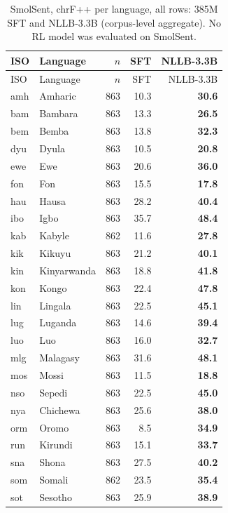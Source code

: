 {\footnotesize\setlength{\tabcolsep}{3pt}
\begin{longtable}{@{}llrrr@{}}
\caption{SmolSent, chrF++ per language, all rows: 385M SFT and NLLB-3.3B (corpus-level aggregate). No RL model was evaluated on SmolSent.}\label{tab:full-smol-chrfpp}\\
\toprule
ISO & Language & $n$ & SFT & NLLB-3.3B \\
\midrule\endfirsthead
\toprule
ISO & Language & $n$ & SFT & NLLB-3.3B \\
\midrule\endhead
\midrule\endfoot
\bottomrule\endlastfoot
amh & Amharic & 863 & 10.3 & \textbf{30.6} \\
bam & Bambara & 863 & 13.3 & \textbf{26.5} \\
bem & Bemba & 863 & 13.8 & \textbf{32.3} \\
dyu & Dyula & 863 & 10.5 & \textbf{20.8} \\
ewe & Ewe & 863 & 20.6 & \textbf{36.0} \\
fon & Fon & 863 & 15.5 & \textbf{17.8} \\
hau & Hausa & 863 & 28.2 & \textbf{40.4} \\
ibo & Igbo & 863 & 35.7 & \textbf{48.4} \\
kab & Kabyle & 862 & 11.6 & \textbf{27.8} \\
kik & Kikuyu & 863 & 21.2 & \textbf{40.1} \\
kin & Kinyarwanda & 863 & 18.8 & \textbf{41.8} \\
kon & Kongo & 863 & 22.4 & \textbf{47.8} \\
lin & Lingala & 863 & 22.5 & \textbf{45.1} \\
lug & Luganda & 863 & 14.6 & \textbf{39.4} \\
luo & Luo & 863 & 16.0 & \textbf{32.7} \\
mlg & Malagasy & 863 & 31.6 & \textbf{48.1} \\
mos & Mossi & 863 & 11.5 & \textbf{18.8} \\
nso & Sepedi & 863 & 22.5 & \textbf{45.0} \\
nya & Chichewa & 863 & 25.6 & \textbf{38.0} \\
orm & Oromo & 863 & 8.5 & \textbf{34.9} \\
run & Kirundi & 863 & 15.1 & \textbf{33.7} \\
sna & Shona & 863 & 27.5 & \textbf{40.2} \\
som & Somali & 862 & 23.5 & \textbf{35.4} \\
sot & Sesotho & 863 & 25.9 & \textbf{38.9} \\

\end{longtable}}
